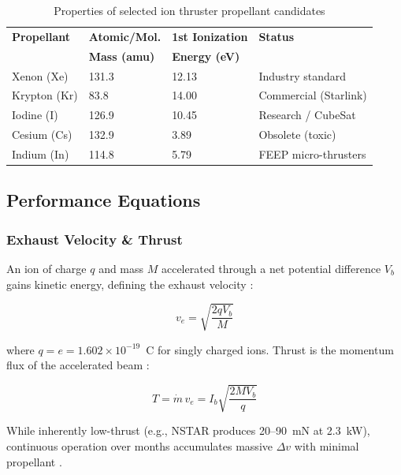 \begin{table}[htb]
\centering
\caption{Properties of selected ion thruster propellant candidates \cite{dietz_2019, fep_book}}
\label{tab:ion_propellants}
\begin{tabular}{@{}llll@{}}
\toprule
\textbf{Propellant} & \textbf{Atomic/Mol.} & \textbf{1st Ionization} & \textbf{Status} \\
                    & \textbf{Mass (amu)}  & \textbf{Energy (eV)}    &                 \\ \midrule
Xenon (Xe)   & 131.3 & 12.13 & Industry standard \\
Krypton (Kr) & 83.8  & 14.00 & Commercial (Starlink) \\
Iodine (I)   & 126.9 & 10.45 & Research / CubeSat \\
Cesium (Cs)  & 132.9 & 3.89  & Obsolete (toxic) \\
Indium (In)  & 114.8 & 5.79  & FEEP micro-thrusters \\ \bottomrule
\end{tabular}
\end{table}

\subsection{Performance Equations}

\subsubsection{Exhaust Velocity \& Thrust}

An ion of charge $q$ and mass $M$ accelerated through a net potential difference $V_b$ gains kinetic energy, defining the exhaust velocity \cite{holste_2020}:

\begin{equation}
\label{eq:ion_ve}
    v_e = \sqrt{\frac{2 q V_b}{M}}
\end{equation}

where $q = e = 1.602 \times 10^{-19}$~C for singly charged ions. Thrust is the momentum flux of the accelerated beam \cite{fep_book}:

\begin{equation}
\label{eq:ion_thrust}
    T = \dot{m} \, v_e = I_b \sqrt{\frac{2 M V_b}{q}}
\end{equation}

While inherently low-thrust (e.g., NSTAR produces 20--90~mN at 2.3~kW), continuous operation over months accumulates massive $\Delta v$ with minimal propellant \cite{holste_2020}.


